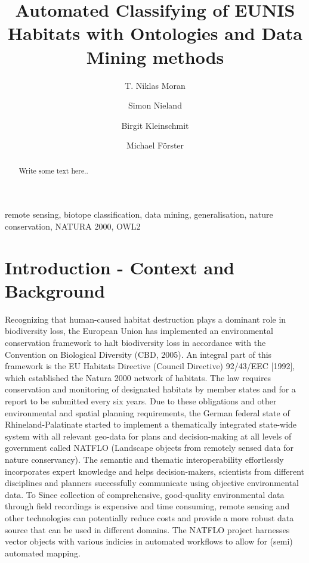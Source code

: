 \documentclass[authoryear, review,12pt,number]{elsarticle}
\begin{document}
\begin{frontmatter}
\linenumbers
\title{Automated Classifying of EUNIS Habitats with Ontologies and Data Mining
methods}


\author[TUB]{T. Niklas Moran}

\author[TUB]{Simon Nieland}
\author[TUB]{Birgit Kleinschmit}

\author[TUB]{Michael F\"orster}

\address[TUB]{Geoinformation in Environmental Planning Lab, Technische
Universit\"at Berlin, Stra\ss e des 17. Juni 145, 10623 Berlin, Germany}

\begin{abstract}
Write some text here..
\end{abstract}

\begin{keyword}
remote sensing, biotope classification, data mining,
generalisation, nature conservation, NATURA 2000, OWL2
\end{keyword}

\end{frontmatter}

\linenumbers

\section{Introduction - Context and Background}
Recognizing that human-caused habitat destruction plays a dominant role in
biodiversity loss, the European Union has implemented an environmental
conservation framework to halt biodiversity loss in accordance with the
Convention on Biological Diversity (CBD, 2005). An integral part of this
framework is the EU Habitats Directive (Council Directive) 92/43/EEC [1992],
which established the Natura 2000 network of habitats. The law requires
conservation and monitoring of designated habitats by member states and for a
report to be submitted every six years. Due to these obligations and other
environmental and spatial planning requirements, the German federal state of
Rhineland-Palatinate started to implement a thematically integrated
state-wide system with all relevant geo-data for plans and decision-making at
all levels of government called NATFLO (Landscape objects from remotely
sensed data for nature conservancy). The semantic and thematic interoperability
effortlessly incorporates expert knowledge and helps decision-makers, scientists
from different disciplines and planners successfully communicate using
objective environmental data. To 
Since collection of comprehensive,
good-quality environmental data through field recordings is expensive and time
consuming, remote sensing and other technologies can potentially reduce costs
and provide a more robust data source that can be used in different domains. The
NATFLO project harnesses vector objects with various indicies in automated
workflows to allow for (semi) automated mapping. %
\end{document}
